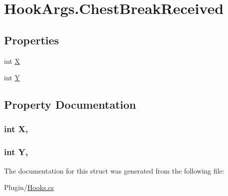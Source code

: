 \hypertarget{structOTA_1_1Plugin_1_1HookArgs_1_1ChestBreakReceived}{}\section{Hook\+Args.\+Chest\+Break\+Received}
\label{structOTA_1_1Plugin_1_1HookArgs_1_1ChestBreakReceived}
\subsection*{Properties}
\begin{DoxyCompactItemize}
\item 
int \hyperlink{structOTA_1_1Plugin_1_1HookArgs_1_1ChestBreakReceived_a80c0944640e62d3ed6c5419c1bcc0c88}{X}
\item 
int \hyperlink{structOTA_1_1Plugin_1_1HookArgs_1_1ChestBreakReceived_aa482c4cc86a24474e4fb19b5b5978778}{Y}
\end{DoxyCompactItemize}


\subsection{Property Documentation}
\hypertarget{structOTA_1_1Plugin_1_1HookArgs_1_1ChestBreakReceived_a80c0944640e62d3ed6c5419c1bcc0c88}{}
\subsubsection[{X}]{\setlength{\rightskip}{0pt plus 5cm}int X\hspace{0.3cm}{\ttfamily [get]}, {\ttfamily [set]}}\label{structOTA_1_1Plugin_1_1HookArgs_1_1ChestBreakReceived_a80c0944640e62d3ed6c5419c1bcc0c88}
\hypertarget{structOTA_1_1Plugin_1_1HookArgs_1_1ChestBreakReceived_aa482c4cc86a24474e4fb19b5b5978778}{}
\subsubsection[{Y}]{\setlength{\rightskip}{0pt plus 5cm}int Y\hspace{0.3cm}{\ttfamily [get]}, {\ttfamily [set]}}\label{structOTA_1_1Plugin_1_1HookArgs_1_1ChestBreakReceived_aa482c4cc86a24474e4fb19b5b5978778}


The documentation for this struct was generated from the following file\+:\begin{DoxyCompactItemize}
\item 
Plugin/\hyperlink{Hooks_8cs}{Hooks.\+cs}\end{DoxyCompactItemize}
